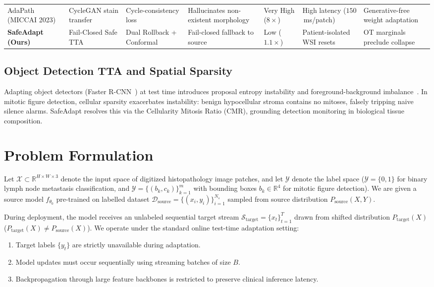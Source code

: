 \documentclass[journal]{IEEEtran}
\begin{document}
\begin{table}[t]
{\begin{tabular}{@{}p{2.0cm}p{2.2cm}p{2.3cm}p{2.3cm}p{1.6cm}p{2.6cm}p{3.0cm}@{}}
AdaPath (MICCAI 2023)~\cite{chen2023adapath} & CycleGAN stain transfer & Cycle-consistency loss & Hallucinates non-existent morphology & Very High ($8\times$) & High latency ($150$\,ms/patch) & Generative-free weight adaptation \\
\textbf{SafeAdapt (Ours)} & Fail-Closed Safe TTA & Dual Rollback + Conformal & Fail-closed fallback to source & Low ($1.1\times$) & Patient-isolated WSI resets & OT marginals preclude collapse \\
\bottomrule
\end{tabular}%
}
\end{table}

\subsection{Object Detection TTA and Spatial Sparsity}
Adapting object detectors (Faster R-CNN~\cite{ren2015fasterrcnn}) at test time introduces proposal entropy instability and foreground-background imbalance~\cite{liang2023comprehensive}. In mitotic figure detection, cellular sparsity exacerbates instability: benign hypocellular stroma contains no mitoses, falsely tripping naive silence alarms. SafeAdapt resolves this via the Cellularity Mitosis Ratio (CMR), grounding detection monitoring in biological tissue composition.

\section{Problem Formulation}
Let $\mathcal{X} \subset \mathbb{R}^{H \times W \times 3}$ denote the input space of digitized histopathology image patches, and let $\mathcal{Y}$ denote the label space ($\mathcal{Y} = \{0, 1\}$ for binary lymph node metastasis classification, and $\mathcal{Y} = \{(b_k, c_k)\}_{k=1}^m$ with bounding boxes $b_k \in \mathbb{R}^4$ for mitotic figure detection). We are given a source model $f_{\theta_0}$ pre-trained on labelled dataset $\mathcal{D}_{\text{source}} = \{(x_i, y_i)\}_{i=1}^{N_s}$ sampled from source distribution $P_{\text{source}}(X, Y)$.

During deployment, the model receives an unlabeled sequential target stream $\mathcal{S}_{\text{target}} = \{x_t\}_{t=1}^T$ drawn from shifted distribution $P_{\text{target}}(X)$ ($P_{\text{target}}(X) \ne P_{\text{source}}(X)$). We operate under the standard online test-time adaptation setting:
\begin{enumerate}\setlength{\itemsep}{1pt}\setlength{\parskip}{0pt}
\item Target labels $\{y_t\}$ are strictly unavailable during adaptation.
\item Model updates must occur sequentially using streaming batches of size $B$.
\item Backpropagation through large feature backbones is restricted to preserve clinical inference latency.
\end{enumerate}
\end{document}
